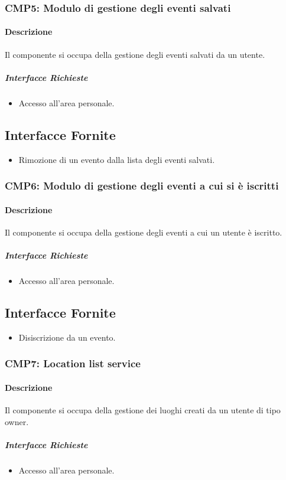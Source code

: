 \documentclass[9pt]{extarticle}
\begin{document}
\subsubsection*{CMP5: Modulo di gestione degli eventi salvati}
\paragraph{Descrizione}
Il componente si occupa della gestione degli eventi salvati da un utente.
\subparagraph{Interfacce Richieste}
\begin{itemize}
	\item Accesso all'area personale.
\end{itemize}
\subsection{Interfacce Fornite}
\begin{itemize}
	\item Rimozione di un evento dalla lista degli eventi salvati.
\end{itemize}

\subsubsection*{CMP6: Modulo di gestione degli eventi a cui si è iscritti}
\paragraph{Descrizione}
Il componente si occupa della gestione degli eventi a cui un utente è iscritto.
\subparagraph{Interfacce Richieste}
\begin{itemize}
	\item Accesso all'area personale.
\end{itemize}
\subsection{Interfacce Fornite}
\begin{itemize}
	\item Disiscrizione da un evento.
\end{itemize}

\subsubsection*{CMP7: Location list service}
\paragraph{Descrizione}
Il componente si occupa della gestione dei luoghi creati da un utente di tipo owner.
\subparagraph{Interfacce Richieste}
\begin{itemize}
	\item Accesso all'area personale.
\end{itemize}
\end{document}
